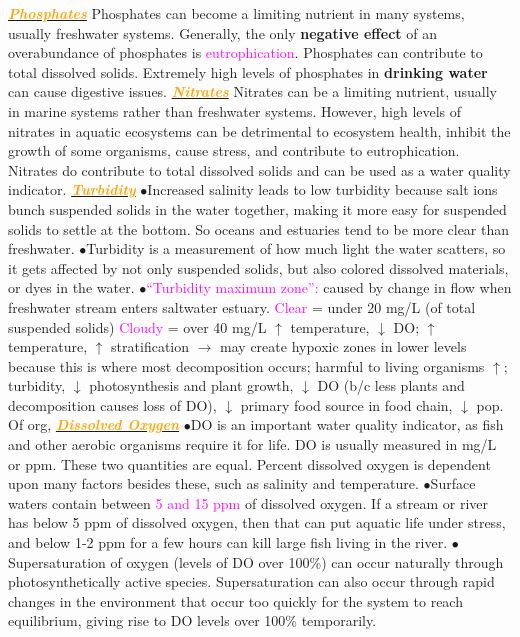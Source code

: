 \documentclass{article}
\newcommand{\ddd}{$\bullet$}
\newcommand{\pink}[1]{\textcolor{magenta}{#1}}
\newcommand{\orange}[1]{\textcolor{orange}{#1}}
\newcommand{\mysubsection}[1]{\underline{\textbf{{\textit{\orange{#1}}}}}}
\newcommand{\vocab}[1]{{\pink{#1}}}
\begin{document}
\begin{multicols*}{4}
        \mysubsection{Phosphates}
            Phosphates can become a limiting nutrient in many systems, usually freshwater systems. Generally, the only \textbf{negative effect} of an overabundance of phosphates is \pink{eutrophication}. Phosphates can contribute to total dissolved solids. Extremely high levels of phosphates in \textbf{drinking water} can cause digestive issues. 
        \mysubsection{Nitrates}
           Nitrates can be a limiting nutrient, usually in marine systems rather than freshwater systems. However, high levels of nitrates in aquatic ecosystems can be detrimental to ecosystem health, inhibit the growth of some organisms, cause stress, and contribute to eutrophication. Nitrates do contribute to total dissolved solids and can be used as a water quality indicator. 
        \mysubsection{Turbidity}
            \ddd Increased salinity leads to low turbidity because salt ions bunch suspended solids in the water together, making it more easy for suspended solids to settle at the bottom. So oceans and estuaries tend to be more clear than freshwater. 
            \ddd Turbidity is a measurement of how much light the water scatters, so it gets affected by not only suspended solids, but also colored dissolved materials, or dyes in the water.
            \ddd \vocab{“Turbidity maximum zone”: }caused by change in flow when freshwater stream enters saltwater estuary. \pink{Clear} = under 20 mg/L (of total suspended solids) \pink{Cloudy} = over 40 mg/L $ \uparrow $ temperature, $ \downarrow $ DO; $ \uparrow $ temperature, $ \uparrow $ stratification $ \rightarrow $ may create hypoxic zones in lower levels because this is where most decomposition occurs; harmful to living organisms $ \uparrow $; turbidity, $ \downarrow $ photosynthesis and plant growth,  $ \downarrow $ DO (b/c less plants and decomposition causes loss of DO), $ \downarrow $ primary food source in food chain, $ \downarrow $ pop. Of org,
        \mysubsection{Dissolved Oxygen}
            \ddd DO is an important water quality indicator, as fish and other aerobic organisms require it for life. DO is usually measured in mg/L or ppm. These two quantities are equal. Percent dissolved oxygen is dependent upon many factors besides these, such as salinity and temperature.
            \ddd Surface waters contain between \pink{5 and 15 ppm} of dissolved oxygen. If a stream or river has below 5 ppm of dissolved oxygen, then that can put aquatic life under stress, and below 1-2 ppm for a few hours can kill large fish living in the river.
            \ddd Supersaturation of oxygen (levels of DO over 100\%) can occur naturally through photosynthetically active species. Supersaturation can also occur through rapid changes in the environment that occur too quickly for the system to reach equilibrium, giving rise to DO levels over 100\% temporarily.

\end{multicols*}
\end{document}
